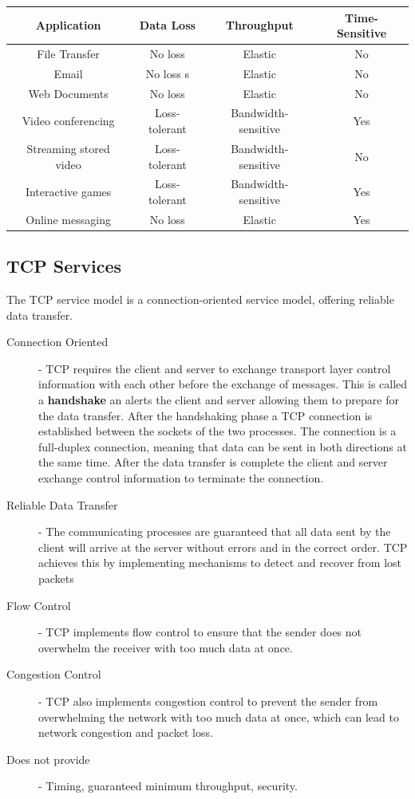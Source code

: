 \documentclass[12pt letter]{report}
\begin{document}
\begin{table}[h!]
  \begin{center}
    \begin{tabular}{|c c c c|}
      \hline
      Application & Data Loss & Throughput & Time-Sensitive\\ [0.5ex]
      \hline
      \hline
      File Transfer & No loss & Elastic & No \\
      Email & No loss s & Elastic & No \\
      Web Documents & No loss & Elastic & No \\
      Video conferencing & Loss-tolerant & Bandwidth-sensitive & Yes \\
      Streaming stored video & Loss-tolerant & Bandwidth-sensitive & No \\
      Interactive games & Loss-tolerant & Bandwidth-sensitive & Yes \\
      Online messaging & No loss & Elastic & Yes \\
      \hline
    \end{tabular}
  \end{center}
\end{table}

\subsection{TCP Services}

The TCP service model is a connection-oriented service model,
offering reliable data transfer.

\begin{description}
  \item[Connection Oriented]  - TCP requires the client and server to
    exchange transport layer control information with each other
    before the exchange of messages. This is called a
    \textbf{handshake} an alerts the client and server allowing them
    to prepare for the data transfer. After the handshaking phase a
    TCP connection is established between the sockets of the two
    processes. The connection is a full-duplex connection, meaning
    that data can be sent in both directions at the same time. After
    the data transfer is complete the client and server exchange
    control information to terminate the connection.
  \item[Reliable Data Transfer] - The communicating processes are
    guaranteed that all data sent by the client will arrive at the
    server without errors and in the correct order. TCP achieves this
    by implementing mechanisms to detect and recover from lost packets
  \item[Flow Control] - TCP implements flow control to
    ensure that the sender does not overwhelm the receiver with too
    much data at once.
  \item[Congestion Control] - TCP also implements congestion control to
    prevent the sender from overwhelming the network with too much
    data at once, which can lead to network congestion and packet loss.
  \item[Does not provide] - Timing, guaranteed minimum throughput, security.
\end{description}
\end{document}

